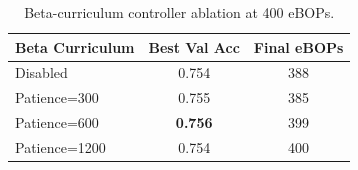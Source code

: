 \begin{table}[t]
\centering
\caption{Beta-curriculum controller ablation at 400 eBOPs.}
\label{tab:beta_ablation}
\begin{tabular}{lcc}
\toprule
Beta Curriculum & Best Val Acc & Final eBOPs \\
\midrule
Disabled & 0.754 & 388 \\
Patience=300 & 0.755 & 385 \\
Patience=600 & \textbf{0.756} & 399 \\
Patience=1200 & 0.754 & 400 \\
\bottomrule
\end{tabular}
\end{table}
